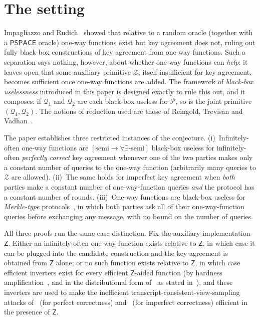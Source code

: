 \documentclass{aicr-conjecture}
\newcommand{\Zc}{\mathcal{Z}}
\newcommand{\Pc}{\mathcal{P}}
\newcommand{\Qc}{\mathcal{Q}}
\newcommand{\semibbu}{[\mathrm{semi}\to\forall\exists\text{-semi}]}
\newcommand{\Zs}{\mathsf{Z}}
\begin{document}
\section{The setting}\label{sec:setting}

Impagliazzo and Rudich~\cite{IR89} showed that relative to a random
oracle (together with a $\mathsf{PSPACE}$ oracle) one-way functions exist
but key agreement does not, ruling out fully black-box constructions of
key agreement from one-way functions. Such a separation says nothing,
however, about whether one-way functions can \emph{help}: it leaves open
that some auxiliary primitive $\Zc$, itself insufficient for key
agreement, becomes sufficient once one-way functions are added. The
framework of \emph{black-box uselessness} introduced in this paper is
designed exactly to rule this out, and it composes: if $\Qc_1$ and
$\Qc_2$ are each black-box useless for $\Pc$, so is the joint primitive
$(\Qc_1,\Qc_2)$. The notions of reduction used are those of Reingold,
Trevisan and Vadhan~\cite{RTV04}.

The paper establishes three restricted instances of the conjecture.
(i)~Infinitely-often one-way functions are $\semibbu$ black-box useless
for infinitely-often \emph{perfectly correct} key agreement whenever one
of the two parties makes only a constant number of queries to the one-way
function (arbitrarily many queries to $\Zc$ are allowed). (ii)~The same
holds for imperfect key agreement when \emph{both} parties make a
constant number of one-way-function queries \emph{and} the protocol has a
constant number of rounds. (iii)~One-way functions are black-box useless
for \emph{Merkle-type} protocols~\cite{Mer78}, in which both parties ask
all of their one-way-function queries before exchanging any message, with
no bound on the number of queries.

All three proofs run the same case distinction. Fix the auxiliary
implementation $\Zs$. Either an infinitely-often one-way function exists
relative to $\Zs$, in which case it can be plugged into the candidate
construction and the key agreement is obtained from $\Zs$ alone; or no
such function exists relative to $\Zs$, in which case efficient inverters
exist for every efficient $\Zs$-aided function (by hardness
amplification~\cite{Yao82}, and in the distributional form
of~\cite{IL89} as stated in~\cite{BHT14}), and these inverters are used
to make the inefficient transcript-consistent-view-sampling attacks
of~\cite{BKSY11} (for perfect correctness) and~\cite{IR89,BM09,BM17}
(for imperfect correctness) efficient in the presence of $\Zs$.
\end{document}
